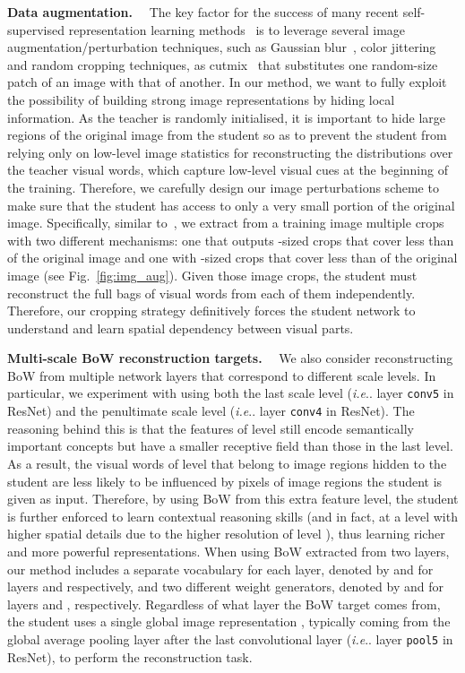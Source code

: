 \documentclass[final]{cvpr}
\makeatletter
\newcommand{\parag}[1]{\smallskip\noindent\textbf{#1}~~}
\DeclareRobustCommand\onedot{\futurelet\@let@token\@onedot}
\def\@onedot{\ifx\@let@token.\else.\null\fi\xspace}
\def\ie{\emph{i.e}\onedot} \def\Ie{\emph{I.e}\onedot}
\makeatother
\begin{document}
\parag{Data augmentation.}
The key factor for the success of many recent self-supervised representation learning methods~\cite{caron2020unsupervised,chen2020simple, chen2020improved, grill2020bootstrap,tian2020makes} is to leverage several image augmentation/perturbation techniques, such as Gaussian blur~\cite{chen2020simple}, color jittering and random cropping techniques, as cutmix~\cite{yun2019cutmix} that substitutes one random-size patch of an image with that of another.
In our method, we want to fully exploit the possibility of building strong image representations by hiding local information. 
As the teacher is randomly initialised, it is important to hide large regions of the original image from the student so as to prevent the student from relying only on low-level image statistics for reconstructing the distributions  over the teacher visual words, which capture low-level visual cues at the beginning of the training.
Therefore, we carefully design our image perturbations scheme to make sure that the student has access to only a very small portion of the original image.
Specifically, similar to~\cite{caron2020unsupervised,misra2020self}, we extract from a training image multiple crops with two different mechanisms: one that outputs -sized crops that cover less than  of the original image and one with -sized crops that cover less than  of the original image (see Fig.~\ref{fig:img_aug}). 
Given those image crops, the student must reconstruct the full bags of visual words from each of them independently.
Therefore, our cropping strategy definitively forces the student network to understand and learn spatial dependency between visual parts. 

\parag{Multi-scale BoW reconstruction targets.}
We also consider reconstructing BoW from multiple network layers that correspond to different scale levels. In particular, we experiment with using
both the last scale level  (\ie layer \texttt{conv5} in ResNet) and the penultimate scale level  (\ie layer \texttt{conv4} in ResNet).
The reasoning behind this is that the features of level  still encode semantically important concepts but have a smaller receptive field than those in the last level.
As a result, the visual words of level  that belong to image regions hidden to the student are less likely to be influenced by pixels of image regions 
the student is given as input.
Therefore, by using BoW from this extra feature level, the student is further enforced to learn contextual reasoning skills (and in fact, at a level with higher spatial details due to the higher resolution of level ), thus learning richer and more powerful representations. 
When using BoW extracted from two layers, our method includes a separate vocabulary for each layer, denoted by  and  for layers  and  respectively, and two different weight generators, denoted by  and  for layers  and , respectively.
Regardless of what layer the BoW target comes from, the student uses a single global image representation , typically coming from the global average pooling layer after the last convolutional layer (\ie layer \texttt{pool5} in ResNet), to perform the reconstruction task.\\
\end{document}
